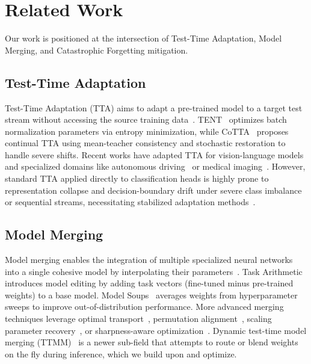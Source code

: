 \documentclass{article}
\theoremstyle{plain}
\theoremstyle{definition}
\theoremstyle{remark}
\begin{document}
\section{Related Work}
\label{submission-related}

Our work is positioned at the intersection of Test-Time Adaptation, Model Merging, and Catastrophic Forgetting mitigation.

\subsection{Test-Time Adaptation}
Test-Time Adaptation (TTA) aims to adapt a pre-trained model to a target test stream without accessing the source training data~\citep{wang2021tent, wang2022continual, shao2023test}. TENT~\citep{wang2021tent} optimizes batch normalization parameters via entropy minimization, while CoTTA~\citep{wang2022continual} proposes continual TTA using mean-teacher consistency and stochastic restoration to handle severe shifts. Recent works have adapted TTA for vision-language models~\citep{sichen2025paf, aodili2025flatness, hyeongijang2026improving} and specialized domains like autonomous driving~\citep{huitong2025codemerge} or medical imaging~\citep{zinan2024adaptify, jianghaowu2025samaware, hariharanravishankar2025uattaqsm}. However, standard TTA applied directly to classification heads is highly prone to representation collapse and decision-boundary drift under severe class imbalance or sequential streams, necessitating stabilized adaptation methods~\citep{sata2026sata, symerge2026sbf}.

\subsection{Model Merging}
Model merging enables the integration of multiple specialized neural networks into a single cohesive model by interpolating their parameters~\citep{wortsman2022model, matena2021merging}. Task Arithmetic~\citep{ilharco2022editing} introduces model editing by adding task vectors (fine-tuned minus pre-trained weights) to a base model. Model Soups~\citep{wortsman2022model} averages weights from hyperparameter sweeps to improve out-of-distribution performance. More advanced merging techniques leverage optimal transport~\citep{singh2020model}, permutation alignment~\citep{ainsworth2022git, stoica2023zipit}, scaling parameter recovery~\citep{jordan2024repair}, or sharpness-aware optimization~\citep{sata2026sata, spor2026spor, wang2024sharpness}. Dynamic test-time model merging (TTMM)~\citep{zhao2024test, li2024collaborative} is a newer sub-field that attempts to route or blend weights on the fly during inference, which we build upon and optimize.
\end{document}
